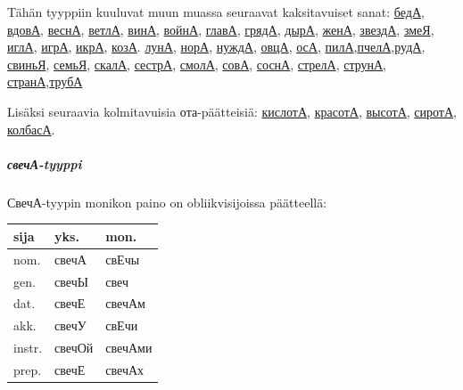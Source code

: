 \documentclass[]{scrartcl}
\begin{document}
Tähän tyyppiin kuuluvat muun muassa seuraavat kaksitavuiset sanat:
\href{http://ru.wiktionary.org/wiki/беда}{бедА},
\href{http://ru.wiktionary.org/wiki/вдова}{вдовА},
\href{http://ru.wiktionary.org/wiki/весна}{веснА},
\href{http://ru.wiktionary.org/wiki/ветла}{ветлА},
\href{http://ru.wiktionary.org/wiki/вина}{винА},
\href{http://ru.wiktionary.org/wiki/война}{войнА},
\href{http://ru.wiktionary.org/wiki/глава}{главА},
\href{http://ru.wiktionary.org/wiki/гряда}{грядА},
\href{http://ru.wiktionary.org/wiki/дыра}{дырА},
\href{http://ru.wiktionary.org/wiki/жена}{женА},
\href{http://ru.wiktionary.org/wiki/звезда}{звездА},
\href{http://ru.wiktionary.org/wiki/змея}{змеЯ},
\href{http://ru.wiktionary.org/wiki/игла}{иглА},
\href{http://ru.wiktionary.org/wiki/игра}{игрА},
\href{http://ru.wiktionary.org/wiki/икра}{икрА},
\href{http://ru.wiktionary.org/wiki/коза}{козА}.
\href{http://ru.wiktionary.org/wiki/луна}{лунА},
\href{http://ru.wiktionary.org/wiki/нора}{норА},
\href{http://ru.wiktionary.org/wiki/нужда}{нуждА},
\href{http://ru.wiktionary.org/wiki/овца}{овцА},
\href{http://ru.wiktionary.org/wiki/оса}{осА},
\href{http://ru.wiktionary.org/wiki/пила}{пилА},\href{http://ru.wiktionary.org/wiki/пчела}{пчелА},\href{http://ru.wiktionary.org/wiki/руда}{рудА},
\href{http://ru.wiktionary.org/wiki/свинья}{свиньЯ},
\href{http://ru.wiktionary.org/wiki/семья}{семьЯ},
\href{http://ru.wiktionary.org/wiki/скала}{скалА},
\href{http://ru.wiktionary.org/wiki/сестра}{сестрА},
\href{http://ru.wiktionary.org/wiki/смола}{смолА},
\href{http://ru.wiktionary.org/wiki/сова}{совА},
\href{http://ru.wiktionary.org/wiki/сосна}{соснА},
\href{http://ru.wiktionary.org/wiki/стрела}{стрелА},
\href{http://ru.wiktionary.org/wiki/струна}{струнА},
\href{http://ru.wiktionary.org/wiki/страна}{странА},\href{http://ru.wiktionary.org/wiki/труба}{трубА}

Lisäksi seuraavia kolmitavuisia ота-päätteisiä:
\href{http://ru.wiktionary.org/wiki/кислота}{кислотА},
\href{http://ru.wiktionary.org/wiki/красота}{красотА},
\href{http://ru.wiktionary.org/wiki/высота}{высотА},
\href{http://ru.wiktionary.org/wiki/сирота}{сиротА},
\href{http://ru.wiktionary.org/wiki/колбаса}{колбасА}.

\subparagraph{свечА-tyyppi}\label{ux441ux432ux435ux447ux430-tyyppi}

СвечА-tyypin monikon paino on obliikvisijoissa päätteellä:

\begin{longtable}[c]{@{}lll@{}}
\toprule
sija & yks. & mon.\tabularnewline
\midrule
\endhead
nom. & свечА & свЕчы\tabularnewline
gen. & свечЫ & свеч\tabularnewline
dat. & свечЕ & свечАм\tabularnewline
akk. & свечУ & свЕчи\tabularnewline
instr. & свечОй & свечАми\tabularnewline
prep. & свечЕ & свечАх\tabularnewline
\bottomrule
\end{longtable}
\end{document}
